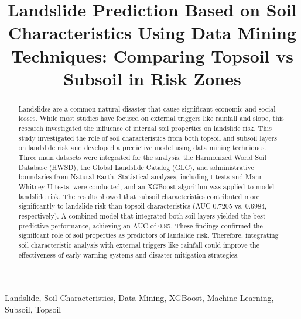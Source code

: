 \documentclass[conference]{IEEEtran}
\begin{document}
\title{Landslide Prediction Based on Soil Characteristics Using Data Mining Techniques: Comparing Topsoil vs Subsoil in Risk Zones}

\author{
}


\maketitle

\begin{abstract}
Landslides are a common natural disaster that cause significant economic and social losses. While most studies have focused on external triggers like rainfall and slope, this research investigated the influence of internal soil properties on landslide risk. This study investigated the role of soil characteristics from both topsoil and subsoil layers on landslide risk and developed a predictive model using data mining techniques. Three main datasets were integrated for the analysis: the Harmonized World Soil Database (HWSD), the Global Landslide Catalog (GLC), and administrative boundaries from Natural Earth. Statistical analyses, including t-tests and Mann-Whitney U tests, were conducted, and an XGBoost algorithm was applied to model landslide risk. The results showed that subsoil characteristics contributed more significantly to landslide risk than topsoil characteristics (AUC 0.7205 vs. 0.6984, respectively). A combined model that integrated both soil layers yielded the best predictive performance, achieving an AUC of 0.85. These findings confirmed the significant role of soil properties as predictors of landslide risk. Therefore, integrating soil characteristic analysis with external triggers like rainfall could improve the effectiveness of early warning systems and disaster mitigation strategies.
\end{abstract}

\vspace{1em} %
\begin{IEEEkeywords}
Landslide, Soil Characteristics, Data Mining, XGBoost, Machine Learning, Subsoil, Topsoil
\end{IEEEkeywords}
\end{document}
